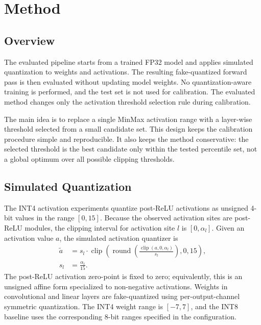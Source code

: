 
\section{Method}
\label{sec:method}

\subsection{Overview}
\label{subsec:method_overview}

The evaluated pipeline starts from a trained FP32 model and applies simulated quantization to weights and activations. The resulting fake-quantized forward pass is then evaluated without updating model weights. No quantization-aware training is performed, and the test set is not used for calibration. The evaluated method changes only the activation threshold selection rule during calibration.

The main idea is to replace a single MinMax activation range with a layer-wise threshold selected from a small candidate set. This design keeps the calibration procedure simple and reproducible. It also keeps the method conservative: the selected threshold is the best candidate only within the tested percentile set, not a global optimum over all possible clipping thresholds.

\subsection{Simulated Quantization}
\label{subsec:quantization_setting}

The INT4 activation experiments quantize post-ReLU activations as unsigned 4-bit values in the range $[0,15]$. Because the observed activation sites are post-ReLU modules, the clipping interval for activation site $l$ is $[0, \alpha_l]$. Given an activation value $a$, the simulated activation quantizer is
\begin{equation}
\begin{aligned}
\tilde{a} &= s_l\cdot\operatorname{clip}\left(
\operatorname{round}\left(\frac{\operatorname{clip}(a,0,\alpha_l)}{s_l}\right),0,15\right), \\
 s_l &= \frac{\alpha_l}{15}.
\end{aligned}
\label{eq:activation_fake_quant}
\end{equation}
The post-ReLU activation zero-point is fixed to zero; equivalently, this is an unsigned affine form specialized to non-negative activations. Weights in convolutional and linear layers are fake-quantized using per-output-channel symmetric quantization. The INT4 weight range is $[-7,7]$, and the INT8 baseline uses the corresponding 8-bit ranges specified in the configuration.

